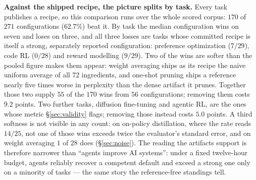 \textbf{Against the shipped recipe, the picture splits by task.} Every task publishes a recipe, so
this comparison runs over the whole scored corpus: $170$ of $271$ configurations ($62.7\%$) beat it.
By task the median configuration wins on seven and loses on three, and all three losses are
tasks whose committed recipe is itself a strong, separately reported configuration: preference
optimization ($7/29$), code RL ($0/28$) and reward modelling ($9/29$). Two of the wins are softer than the pooled figure makes them appear: weight
averaging ships as its recipe the naive uniform average of all $72$ ingredients, and one-shot pruning
ships a reference nearly five times worse in perplexity than the dense artifact it prunes. Together
those two supply $55$ of the $170$ wins from $56$ configurations; removing them costs $9.2$ points. Two further tasks, diffusion fine-tuning and agentic RL, are the ones whose metric
\S\ref{sec:validity} flags; removing those instead costs $5.0$ points. A third softness is not visible
in any count: on on-policy distillation, where the rate reads $14/25$, not one of those wins
exceeds twice the evaluator's standard error, and on weight averaging $1$ of $28$ does
(\S\ref{sec:noise}). The reading the artifacts support is therefore narrower than ``agents improve AI systems'':
under a fixed twelve-hour budget, agents reliably recover a competent default and exceed a strong one
only on a minority of tasks --- the same story the reference-free standings tell.
